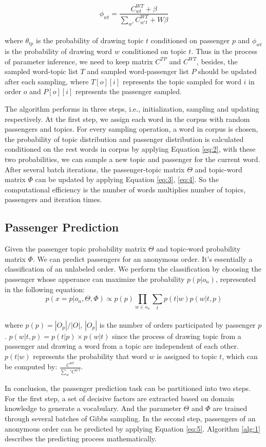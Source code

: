 \documentclass{llncs}
\begin{document}
\begin{equation}
\label{eq:4}
\phi_{wt} = \frac{C_{wt}^{WT}+\beta}{\sum_{w'}C_{w't}^{WT}+W\beta}
\end{equation}\\
where $\theta_{tp}$ is the probability of drawing topic $t$ conditioned on passenger $p$ and $\phi_{wt}$ is the probability of drawing word $w$ conditioned on topic $t$. Thus in the process of parameter inference, we need to keep matrix $C^{TP}$ and $C^{WT}$, besides, the sampled word-topic list $T$ and sampled word-passenger list $P$ should be updated after each sampling, where $T[o][i]$ represents the topic sampled for word $i$ in order $o$ and $P[o][i]$ represents the passenger sampled.\par
The algorithm performs in three steps, i.e., initialization, sampling and updating respectively. At the first step, we assign each word in the corpus with random passengers and topics. For every sampling operation, a word in corpus is chosen, the probability of topic distribution and passenger distribution is calculated conditioned on the rest words in corpus by applying Equation \ref{eq:2}, with these two probabilities, we can sample a new topic and passenger for the current word. After several batch iterations, the passenger-topic matrix $\Theta$ and topic-word matrix $\Phi$ can be updated by applying Equation \ref{eq:3}, \ref{eq:4}. So the computational efficiency is the number of words multiplies number of topics, passengers and iteration times.\par
\subsection{Passenger Prediction}
Given the passenger topic probability matrix $\Theta$ and topic-word probability matrix $\Phi$. We can predict passengers for an anonymous order. It's essentially a classification of an unlabeled order\cite{shanshan:unpopular}. We perform the classification by choosing the passenger whose apperance can maximize the probability $p(p|o_n)$, represented in the following equation:\\
\begin{equation}
\label{eq:5}
p(x=p|o_n,\Theta,\Phi) \propto p(p)\prod_{w \in o_n}\sum_t p(t|w)p(w|t,p)
\end{equation}\\
where $p(p) = |O_p| / |O|$, $|O_p|$ is the number of orders participated by passenger $p$. $p(w|t,p) = p(t|p) \times p(w|t)$ since the process of drawing topic from a passenger and drawing a word from a topic are independent of each other. $p(t|w)$ represents the probability that word $w$ is assigned to topic $t$, which can be computed by: $\frac{C^{wt}}{\sum_w'C^{w't}}$.\par
In conclusion, the passenger prediction task can be partitioned into two steps. For the first step, a set of decisive factors are extracted based on domain  knowledge to generate a vocabulary. And the parameter $\Theta$ and $\Phi$ are trained through several batches of Gibbs sampling. In the second step, passengers of an anonymous order can be predicted by applying Equation \ref{eq:5}. Algorithm \ref{alg:1} describes the predicting process mathematically.\par
\end{document}
